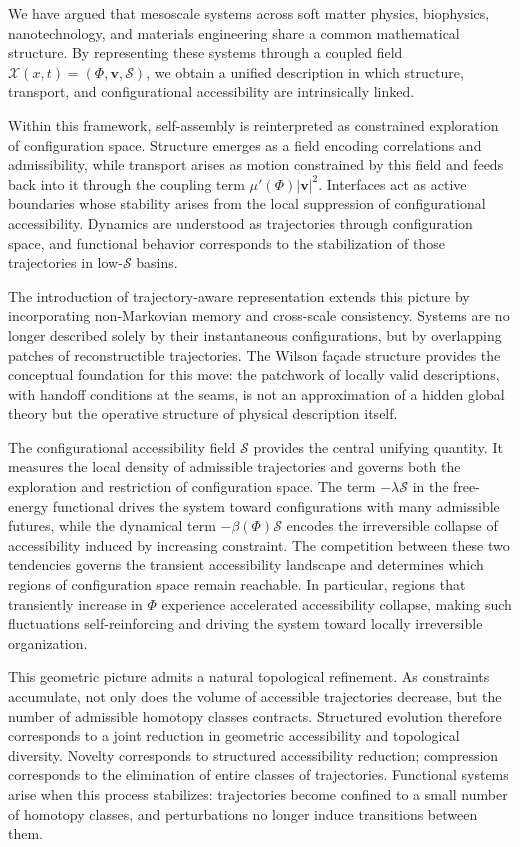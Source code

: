 \documentclass[11pt, a4paper, twocolumn]{article}
\newcommand{\X}{\mathcal{X}}
\newcommand{\Sfield}{\mathcal{S}}
\begin{document}
We have argued that mesoscale systems across soft matter physics, biophysics,
nanotechnology, and materials engineering share a common mathematical structure.
By representing these systems through a coupled field
$\X(x,t) = (\Phi, \mathbf{v}, \Sfield)$, we obtain a unified description in
which structure, transport, and configurational accessibility are intrinsically
linked.

Within this framework, self-assembly is reinterpreted as constrained exploration
of configuration space. Structure emerges as a field encoding correlations and
admissibility, while transport arises as motion constrained by this field and
feeds back into it through the coupling term $\mu'(\Phi)|\mathbf{v}|^2$.
Interfaces act as active boundaries whose stability arises from the local
suppression of configurational accessibility. Dynamics are understood as
trajectories through configuration space, and functional behavior corresponds
to the stabilization of those trajectories in low-$\Sfield$ basins.

The introduction of trajectory-aware representation extends this picture by
incorporating non-Markovian memory and cross-scale consistency. Systems are no
longer described solely by their instantaneous configurations, but by overlapping
patches of reconstructible trajectories. The Wilson façade structure provides
the conceptual foundation for this move: the patchwork of locally valid
descriptions, with handoff conditions at the seams, is not an approximation of
a hidden global theory but the operative structure of physical description
itself.

The configurational accessibility field $\Sfield$ provides the central unifying
quantity. It measures the local density of admissible trajectories and governs
both the exploration and restriction of configuration space. The term
$-\lambda\Sfield$ in the free-energy functional drives the system toward
configurations with many admissible futures, while the dynamical term
$-\beta(\Phi)\Sfield$ encodes the irreversible collapse of accessibility
induced by increasing constraint. The competition between these two tendencies
governs the transient accessibility landscape and determines which regions of
configuration space remain reachable. In particular, regions that transiently
increase in $\Phi$ experience accelerated accessibility collapse, making such
fluctuations self-reinforcing and driving the system toward locally irreversible
organization.

This geometric picture admits a natural topological refinement. As constraints
accumulate, not only does the volume of accessible trajectories decrease, but
the number of admissible homotopy classes contracts. Structured evolution
therefore corresponds to a joint reduction in geometric accessibility and
topological diversity. Novelty corresponds to structured accessibility
reduction; compression corresponds to the elimination of entire classes of
trajectories. Functional systems arise when this process stabilizes: trajectories
become confined to a small number of homotopy classes, and perturbations no
longer induce transitions between them.
\end{document}
